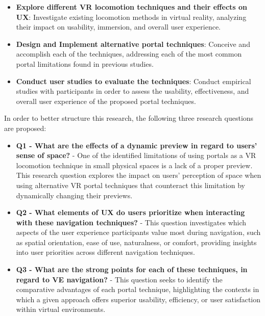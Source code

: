 \begin{itemize}

    \item \textbf{Explore different \gls{VR} locomotion techniques and their effects on \gls{UX}}:
    Investigate existing locomotion methods in virtual reality, analyzing their impact on usability, immersion, and overall user experience.

    \item \textbf{Design and Implement alternative portal techniques}:
    Conceive and accomplish each of the techniques, addressing each of the most common portal limitations found in previous studies.

    \item \textbf{Conduct user studies to evaluate the techniques}: 
    Conduct empirical studies with participants in order to assess the usability, effectiveness, and overall user experience of the proposed portal techniques.
    
\end{itemize}

In order to better structure this research, the following three research questions are proposed:

\begin{itemize}
    \item \textbf{Q1 - What are the effects of a dynamic preview in regard to users' sense of space?} - 
    One of the identified limitations of using portals as a \gls{VR} locomotion technique in small physical spaces is a lack of a proper 
    preview. This research question explores the impact on users' perception of space when using alternative \gls{VR} portal techniques 
    that counteract this limitation by dynamically changing their previews.

     \item \textbf{Q2 - What elements of \gls{UX} do users prioritize when interacting with these navigation techniques?} - 
    This question investigates which aspects of the user experience participants value most during navigation, such as spatial 
    orientation, ease of use, naturalness, or comfort, providing insights into user priorities across different navigation techniques.

    \item \textbf{Q3 - What are the strong points for each of these techniques, in regard to \gls{VE} navigation?} - 
    This question seeks to identify the comparative advantages of each portal technique, highlighting the contexts in which 
    a given approach offers superior usability, efficiency, or user satisfaction within virtual environments.
\end{itemize}

